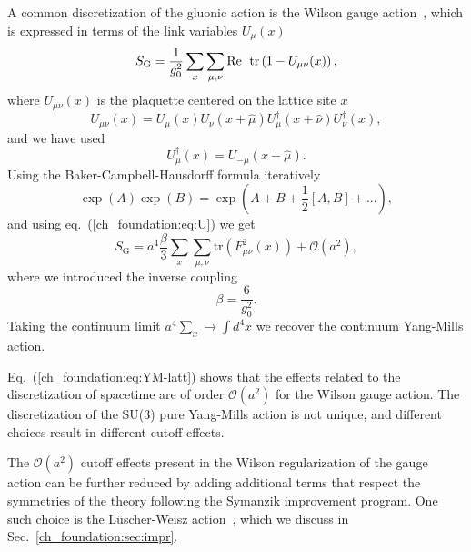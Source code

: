 A common discretization of the gluonic action is the Wilson gauge action~\cite{Wilson:1974sk}, which is expressed in terms of the link variables $U_{\mu}(x)$
\begin{equation}
S_{\textrm{G}}=\frac{1}{g_0^2}\sum_x\sum_{\mu,\nu}{\textrm{Re\; tr}}\left(1-U_{\mu\nu}(x)\right),
\end{equation} 
where $U_{\mu\nu}(x)$ is the plaquette centered on the lattice site $x$
\begin{equation}
\label{ch_foundation:eq:plaq}
U_{\mu\nu}(x)=U_{\mu}(x)U_{\nu}(x+\hat{\mu})U_{\mu}^{\dagger}(x+\hat{\nu})U_{\nu}^{\dagger}(x),
\end{equation}
and we have used 
\begin{equation}
U_{\mu}^{\dagger}(x)=U_{-\mu}(x+\hat{\mu}).
\end{equation}
Using the Baker-Campbell-Hausdorff formula iteratively
\begin{equation}
\exp\left(A\right)\exp\left(B\right)=\exp\left(A+B+\frac{1}{2}\left[A,B\right]+...\right),
\end{equation}
and using eq.~(\ref{ch_foundation:eq:U}) we get
\begin{equation}
\label{ch_foundation:eq:YM-latt}
S_{\textrm{G}}=a^4\frac{\beta}{3}\sum_x\sum_{\mu,\nu}{\textrm{tr}}\left(F_{\mu\nu}^2(x)\right)+\mathcal{O}(a^2),
\end{equation}
where we introduced the inverse coupling
\begin{equation}
\beta=\frac{6}{g_0^2}.
\end{equation}
Taking the continuum limit $a^4\sum_x\rightarrow\int d^4x$ we recover the continuum Yang-Mills action.

Eq.~(\ref{ch_foundation:eq:YM-latt}) shows that the effects related to the discretization of spacetime are of order $\mathcal{O}(a^2)$ for the Wilson gauge action. The discretization of the SU(3) pure Yang-Mills action is not unique, and different choices result in different cutoff effects.

The $\mathcal{O}(a^2)$ cutoff effects present in the Wilson regularization of the gauge action can be further reduced by adding additional terms that respect the symmetries of the theory following the Symanzik improvement program. One such choice is the Lüscher-Weisz action~\cite{}, which we discuss in Sec.~\ref{ch_foundation:sec:impr}.



